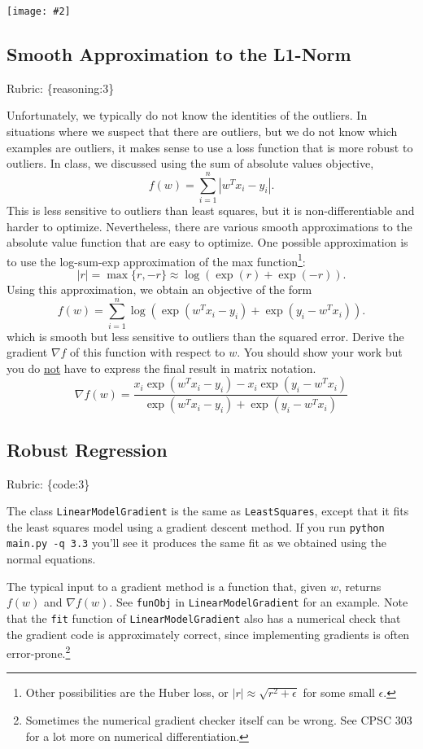 \documentclass{article}
\def\rubric#1{\gre{Rubric: \{#1\}}}{}
\def\blu#1{{\color{blu}#1}}
\def\gre#1{{\color{gre}#1}}
\def\ans#1{{\color{ans}#1}}
\newcommand{\centerfig}[2]{\begin{center}\texttt{[image: \#2]}\end{center}}
\begin{document}
\begin{center}
    
\end{center}

\centerfig{1}{../figs/weighted_least_squares_outliers.pdf}

\subsection{Smooth Approximation to the L1-Norm}
\rubric{reasoning:3}

Unfortunately, we typically do not know the identities of the outliers. In situations where we suspect that there are outliers, but we do not know which examples are outliers, it makes sense to use a loss function that is more robust to outliers. In class, we discussed using the sum of absolute values objective,
\[
f(w) = \sum_{i=1}^n |w^Tx_i - y_i|.
\]
This is less sensitive to outliers than least squares, but it is non-differentiable and harder to optimize. Nevertheless, there are various smooth approximations to the absolute value function that are easy to optimize. One possible approximation is to use the log-sum-exp approximation of the max function\footnote{Other possibilities are the Huber loss, or $|r|\approx \sqrt{r^2+\epsilon}$ for some small $\epsilon$.}:
\[
|r| = \max\{r, -r\} \approx \log(\exp(r) + \exp(-r)).
\]
Using this approximation, we obtain an objective of the form
\[
f(w) {=} \sum_{i=1}^n  \log\left(\exp(w^Tx_i - y_i) + \exp(y_i - w^Tx_i)\right).
\]
which is smooth but less sensitive to outliers than the squared error. \blu{Derive
 the gradient $\nabla f$ of this function with respect to $w$. You should show your work but you do \underline{not} have to express the final result in matrix notation.}
\ans{
    \[
        \nabla f(w) = \frac{x_i\exp(w^Tx_i - y_i) - x_i\exp(y_i - w^Tx_i)}{\exp(w^Tx_i - y_i) + \exp(y_i - w^Tx_i)}
    \]
}

\subsection{Robust Regression}
\rubric{code:3}

The class \texttt{LinearModelGradient} is the same as \texttt{LeastSquares}, except that it fits the least squares model using a gradient descent method. If you run \verb|python main.py -q 3.3| you'll see it produces the same fit as we obtained using the normal equations.

The typical input to a gradient method is a function that, given $w$, returns $f(w)$ and $\nabla f(w)$. See \texttt{funObj} in \texttt{LinearModelGradient} for an example. Note that the \texttt{fit} function of \texttt{LinearModelGradient} also has a numerical check that the gradient code is approximately correct, since implementing gradients is often error-prone.\footnote{Sometimes the numerical gradient checker itself can be wrong. See CPSC 303 for a lot more on numerical differentiation.}
\end{document}
